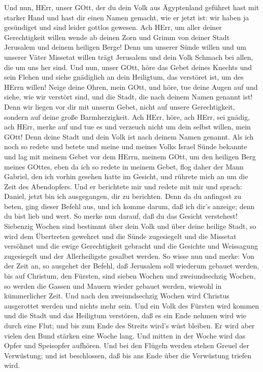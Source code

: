  Und nun, HErr, unser GOtt, der du dein Volk aus
Ägyptenland geführet hast mit starker Hand und hast dir einen Namen
gemacht, wie er jetzt ist: wir haben ja gesündiget und sind leider
gottlos gewesen.  Ach HErr, um aller deiner Gerechtigkeit
willen wende ab deinen Zorn und Grimm von deiner Stadt Jerusalem und
deinem heiligen Berge! Denn um unserer Sünde willen und um unserer Väter
Missetat willen trägt Jerusalem und dein Volk Schmach bei allen, die um
uns her sind.  Und nun, unser GOtt, höre das Gebet deines
Knechts und sein Flehen und siehe gnädiglich an dein Heiligtum, das
verstöret ist, um des HErrn willen!  Neige deine Ohren,
mein GOtt, und höre, tue deine Augen auf und siehe, wie wir verstört
sind, und die Stadt, die nach deinem Namen genannt ist! Denn wir liegen
vor dir mit unserm Gebet, nicht auf unsere Gerechtigkeit, sondern auf
deine große Barmherzigkeit.  Ach HErr, höre, ach HErr, sei
gnädig, ach HErr, merke auf und tue es und verzeuch nicht um dein selbst
willen, mein GOtt! Denn deine Stadt und dein Volk ist nach deinem Namen
genannt.  Als ich noch so redete und betete und meine und
meines Volks Israel Sünde bekannte und lag mit meinem Gebet vor dem
HErrn, meinem GOtt, um den heiligen Berg meines GOttes, 
eben da ich so redete in meinem Gebet, flog daher der Mann Gabriel, den
ich vorhin gesehen hatte im Gesicht, und rührete mich an um die Zeit des
Abendopfers.  Und er berichtete mir und redete mit mir und
sprach: Daniel, jetzt bin ich ausgegangen, dir zu berichten.
 Denn da du anfingest zu beten, ging dieser Befehl aus, und
ich komme darum, daß ich dir's anzeige; denn du bist lieb und wert. So
merke nun darauf, daß du das Gesicht verstehest!  Siebenzig
Wochen sind bestimmt über dein Volk und über deine heilige Stadt, so
wird dem Übertreten gewehret und die Sünde zugesiegelt und die Missetat
versöhnet und die ewige Gerechtigkeit gebracht und die Gesichte und
Weissagung zugesiegelt und der Allerheiligste gesalbet werden.
 So wisse nun und merke: Von der Zeit an, so ausgehet der
Befehl, daß Jerusalem soll wiederum gebauet werden, bis auf Christum,
den Fürsten, sind sieben Wochen und zweiundsechzig Wochen, so werden die
Gassen und Mauern wieder gebauet werden, wiewohl in kümmerlicher Zeit.
 Und nach den zweiundsechzig Wochen wird Christus
ausgerottet werden und nichts mehr sein. Und ein Volk des Fürsten wird
kommen und die Stadt und das Heiligtum verstören, daß es ein Ende nehmen
wird wie durch eine Flut; und bis zum Ende des Streits wird's wüst
bleiben.  Er wird aber vielen den Bund stärken eine Woche
lang. Und mitten in der Woche wird das Opfer und Speisopfer aufhören.
Und bei den Flügeln werden stehen Greuel der Verwüstung; und ist
beschlossen, daß bis ans Ende über die Verwüstung triefen wird.

